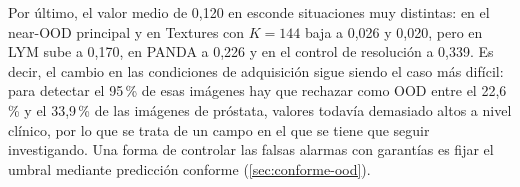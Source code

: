 Por último, el valor medio de 0,120 en  esconde situaciones muy distintas: en el near-OOD principal y en Textures \stoodx con $K = 144$ baja a 0,026 y 0,020, pero en LYM sube a 0,170, en PANDA a 0,226 y en el control de resolución a 0,339. Es decir, el cambio en las condiciones de adquisición sigue siendo el caso más difícil: para detectar el 95\,\% de esas imágenes hay que rechazar como OOD entre el 22,6\,\% y el 33,9\,\% de las imágenes de próstata, valores todavía demasiado altos a nivel clínico, por lo que se trata de un campo en el que se tiene que seguir investigando. Una forma de controlar las falsas alarmas con garantías es fijar el umbral mediante predicción conforme (\cref{sec:conforme-ood}).


\endinput
